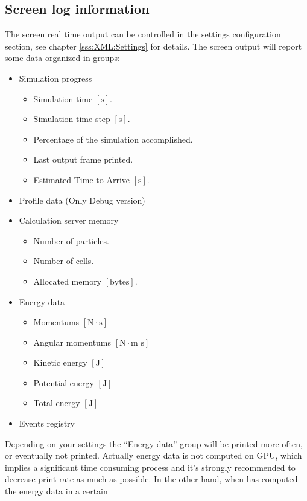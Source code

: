 \subsection{Screen log information}
\label{sss:running:screenlog}
%
The screen real time output can be controlled in the settings configuration
section, see chapter \ref{sss:XML:Settings} for details.\rc
%
The screen output will report some data organized in groups:
%
\begin{itemize}
	\item Simulation progress
	\begin{itemize}
		\item Simulation time $[\mbox{s}]$.
		\item Simulation time step $[\mbox{s}]$.
		\item Percentage of the simulation accomplished.
		\item Last output frame printed.
		\item Estimated Time to Arrive $[\mbox{s}]$.
	\end{itemize}
	\item Profile data (Only Debug version)
	\item Calculation server memory
	\begin{itemize}
		\item Number of particles.
		\item Number of cells.
		\item Allocated memory $[\mbox{bytes}]$.
	\end{itemize}	
	\item Energy data
	\begin{itemize}
		\item Momentums $[\mbox{N} \cdot \mbox{s}]$
		\item Angular momentums $[\mbox{N} \cdot \mbox{m s}]$
		\item Kinetic energy $[\mbox{J}]$
		\item Potential energy $[\mbox{J}]$
		\item Total energy $[\mbox{J}]$
	\end{itemize}	
	\item Events registry
\end{itemize}
%
Depending on your settings the ``Energy data'' group will be printed
more often, or eventually not printed. Actually energy data is not
computed on GPU, which implies a significant time consuming process
and it's strongly recommended to decrease print rate as much as possible.\rc
%
In the other hand, when \NAME has computed the energy data in a certain
